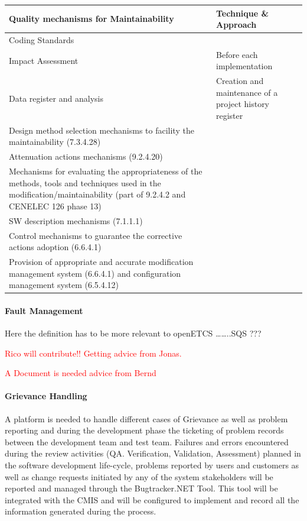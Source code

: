 \documentclass{template/openetcs_article}
\begin{document}
\begin{flushleft}
\tablefirsthead{}
\tablehead{}
\tabletail{}
\tablelasttail{}
\begin{supertabular}{|m{7cm}|m{7cm}|}
\hline
{}
Quality mechanisms for Maintainability &
Technique \& Approach\\\hline
Coding Standards &
~
\\\hline
Impact Assessment &
Before each implementation\\\hline
Data register and analysis &
Creation and maintenance of a project history register\\\hline
Design method selection mechanisms to facility the maintainability (7.3.4.28) &
~
\\\hline
Attenuation actions mechanisms (9.2.4.20) &
~
\\\hline
Mechanisms for evaluating the appropriateness of the methods, tools and techniques used in the modification/maintainability (part of 9.2.4.2 and CENELEC 126 phase 13) &
~
\\\hline
SW description mechanisms (7.1.1.1) &
~
\\\hline
Control mechanisms to guarantee the corrective actions adoption (6.6.4.1) &
~
\\\hline
Provision of appropriate and accurate modification management system (6.6.4.1) and configuration management system (6.5.4.12) &
~
\\\hline
\end{supertabular}
\end{flushleft}









\paragraph{Fault Management}
Here the definition has to be more relevant to openETCS {\dots}{\dots}..SQS ??? 

\textcolor{red}{Rico will contribute!! Getting advice from Jonas.}

\textcolor{red}{A Document is needed advice from Bernd}



\paragraph{Grievance Handling}
A platform is needed to handle different cases of Grievance as well as problem reporting and during the development phase the ticketing of problem records between the development team and test team.
Failures and errors encountered during the review activities (QA. Verification, Validation, Assessment) planned in the software development life-cycle, problems reported by users and customers as well as change requests initiated by any of the system stakeholders will be reported and managed through the Bugtracker.NET Tool. This tool will be integrated with the CMIS and will be configured to implement and record all the information generated during the process.
\end{document}
